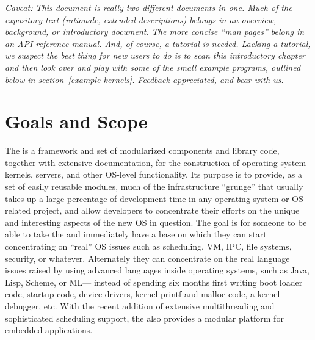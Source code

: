 %
% 
%

\emph{Caveat: This document is really two different documents in
one.  Much of the expository text (rationale, extended descriptions)
belongs in an overview, background, or introductory document.  The
more concise ``man pages'' belong in an API reference manual.  And, of
course, a tutorial is needed.  Lacking a tutorial, we suspect the best
thing for new users to do is to scan this introductory chapter and
then look over and play with some of the small example programs,
outlined below in section~\ref{example-kernels}.  Feedback
appreciated, and bear with us.
}


\section{Goals and Scope}

The \oskit{} is a framework and set of
modularized components and library code,
together with extensive documentation,
for the construction of operating system kernels, servers,
and other OS-level functionality.
Its purpose is to provide, as a set of easily reusable modules,
much of the infrastructure ``grunge''
that usually takes up a large percentage of development time
in any operating system or OS-related project,
and allow developers to concentrate their efforts
on the unique and interesting aspects of the new OS in question.
The goal is for someone to be able to take the \oskit{} and immediately
have a base on which they can start concentrating on ``real'' OS issues
such as scheduling, VM, IPC, file systems, security, or whatever.
Alternately they can concentrate on the real language issues raised by
using advanced languages inside operating systems, such as
Java, Lisp, Scheme, or ML---%
instead of spending six months first writing boot loader code, startup code,
device drivers, kernel printf and malloc code, a kernel debugger, etc.
With the recent addition of extensive multithreading and sophisticated
scheduling support, the \oskit{} also provides a modular platform
for embedded applications.


